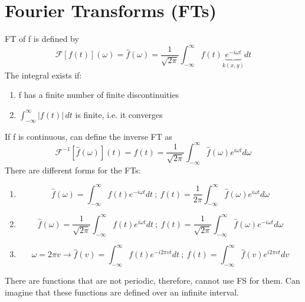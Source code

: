 \documentclass[a4paper, 11pt, normalem]{report}
\newcommand\ifnt{\int_{-\infty}^{\infty}}
\newcommand\om{\omega}
\begin{document}
\section{Fourier Transforms (FTs)}
FT of f is defined by
\begin{equation*}
    \mathcal{F}[f(t)](\om) = \hat{f}(\om) = \frac{1}{\sqrt{2\pi}}\ifnt f(t)\underbrace{e^{-i\om t}}_{k(x,y)}dt
\end{equation*}
The integral exists if:
\begin{enumerate}
    \item f has a finite number of finite discontinuities
    \item $\ifnt |f(t)|\,dt$ is finite, i.e. it converges
\end{enumerate}
If f is continuous, can define the inverse FT as
\begin{equation*}
    \mathcal{F}^{-1}[\hat{f}(\om)](t) = f(t) = \frac{1}{\sqrt{2\pi}} \ifnt \hat{f}(\om) e^{i\om t}d\om
\end{equation*}
There are different forms for the FTs:
\begin{enumerate}
    \item   \begin{equation*}
                \hat{f}(\om) = \ifnt f(t)e^{-i\om t}dt ~;~ f(t) = \frac{1}{2\pi} \ifnt \hat{f}(\om)e^{i\om t}d\om
            \end{equation*}
    \item   \begin{equation*}
                \hat{f}(\om) = \frac{1}{\sqrt{2\pi}} \ifnt f(t)e^{i\om t}dt ~;~ f(t) = \frac{1}{\sqrt{2\pi}} \ifnt \hat{f}(\om)e^{-i\om t}d\om
            \end{equation*}
    \item   \begin{equation*}
                \om = 2\pi v \to \hat{f}(v) = \ifnt f(t)e^{-i2\pi vt}dt ~;~ f(t) = \ifnt \hat{f}(v) e^{i2\pi vt}dv
            \end{equation*}
\end{enumerate}
There are functions that are not periodic, therefore, cannot use FS for them. Can imagine that these functions are defined over an infinite interval.
\end{document}
